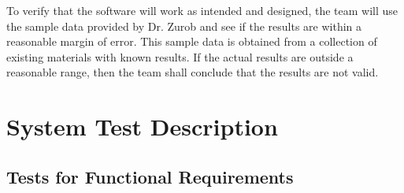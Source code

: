 \documentclass[12pt, titlepage]{article}
\begin{document}
To verify that the software will work as intended and designed, the team will use the sample 
data provided by Dr. Zurob and see if the results are within a reasonable margin of error. This
sample data is obtained from a collection of existing materials with known results. If the actual 
results are outside a reasonable range, then the team shall conclude that the results are not valid. 




\section{System Test Description}
	
\subsection{Tests for Functional Requirements}
\end{document}

